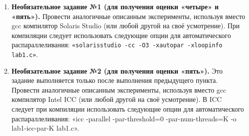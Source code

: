 {\begin{enumerate}
			\begin{itemize}
				 lab1-seq для значений \\$N\;=\;{N1,\;N1+\Delta,\;N1+2\Delta,\;N1+3\Delta,…,\;N2}$ и записывать получающиеся значения времени delta\textunderscore ms(N) в функцию $seq(N)$;
				 lab1-par-K для значений \\$N\;=\;{N1,\;N1+\Delta,\;N1+2\Delta,\;N1+3\Delta,…,\;N2}$ и записывать получающиеся значения времени delta\textunderscore ms(N) в функцию $par-K(N)$;
				 $\Delta$ выбрать так: $\Delta\;=\;(N2\;-\;N1)/10$.
			\end{itemize}
		 верификацию значения X. Добавить в конец цикла вывод значения X и изменить количество экспериментов на 5. Сравнить значения X для распараллеленной программы и не распараллеленной.
		 отчёт о проделанной работе.
		 к устным вопросам на защите.
		 вычислительную сложность алгоритма до и после распараллеливания, сравнить полученные результаты.
		\sloppy
		\item\textbf{Необязательное задание №1 (для получения оценки «четыре» и «пять»).} Провести аналогичные описанным эксперименты, используя вместо gcc компилятор Solaris Studio (или любой другой на своё усмотрение). При компиляции следует использовать следующие опции для автоматического распараллеливания: \verb+«solarisstudio -cc -O3 -xautopar -xloopinfo lab1.c»+.
 		\item\textbf{Необязательное задание №2 (для получения оценки «пять»).} Это задание выполняется только после выполнения предыдущего пункта. Провести аналогичные описанным эксперименты, используя вместо gcc компилятор Intel ICC (или любой другой на своё усмотрение). В ICC следует при компиляции использовать следующие опции для автоматического распараллеливания: «icc -parallel -par-threshold=0 -par-num-threads=K -o lab1-icc-par-K lab1.c».
	\end{enumerate}
	
}
